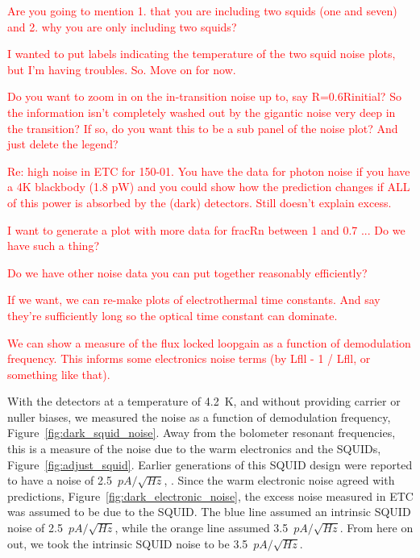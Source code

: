 \textcolor{red}{Are you going to mention 1. that you are including two squids (one and seven) and 2. why you are only including two squids?}

\textcolor{red}{I wanted to put labels indicating the temperature of the two squid noise plots, but I'm having troubles. So. Move on for now.}

\textcolor{red}{Do you want to zoom in on the in-transition noise up to, say R=0.6Rinitial? So the information isn't completely washed out by the gigantic noise very deep in the transition? If so, do you want this to be a sub panel of the noise plot? And just delete the legend?}

\textcolor{red}{Re: high noise in ETC for 150-01. You have the data for photon noise if you have a 4K blackbody (1.8 pW) and you could show how the prediction changes if ALL of this power is absorbed by the (dark) detectors. Still doesn't explain excess.}

\textcolor{red}{I want to generate a plot with more data for fracRn between 1 and 0.7 ... Do we have such a thing?}

\textcolor{red}{Do we have other noise data you can put together reasonably efficiently?}

\textcolor{red}{If we want, we can re-make plots of electrothermal time constants. And say they're sufficiently long so the optical time constant can dominate.}

\textcolor{red}{We can show a measure of the flux locked loopgain as a function of demodulation frequency. This informs some electronics noise terms (by Lfll - 1 / Lfll, or something like that).} 

With the detectors at a temperature of 4.2~K, and without providing carrier or nuller biases, we measured the noise as a function of demodulation frequency, Figure~\ref{fig:dark_squid_noise}. 
Away from the bolometer resonant frequencies, this is a measure of the noise due to the warm electronics and the \ac{SQUID}s, Figure~\ref{fig:adjust_squid}. 
Earlier generations of this \ac{SQUID} design were reported to have a noise of 2.5~$pA/\sqrt{Hz}$, \cite{Huber2001}.
Since the warm electronic noise agreed with predictions, Figure~\ref{fig:dark_electronic_noise}, the excess noise measured in \ac{ETC} was assumed to be due to the \ac{SQUID}. 
The blue line assumed an intrinsic \ac{SQUID} noise of 2.5~$pA/\sqrt{Hz}$, while the orange line assumed 3.5~$pA/\sqrt{Hz}$.
From here on out, we took the intrinsic \ac{SQUID} noise to be 3.5~$pA/\sqrt{Hz}$.


